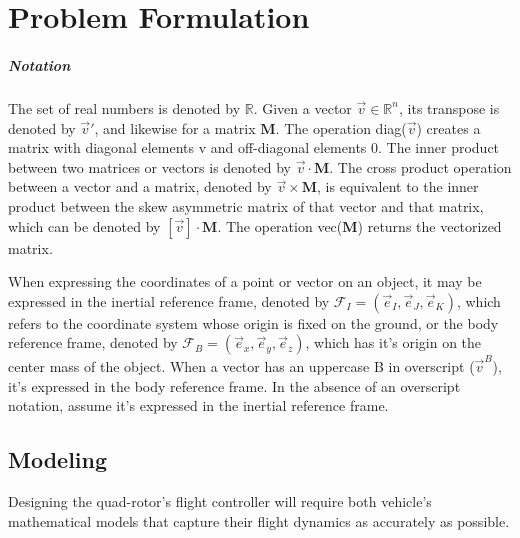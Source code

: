 
%

\chapter{Problem Formulation}
\label{ch:problem_formulation}

\paragraph*{Notation} 
\par The set of real numbers is denoted by $\mathbb{R}$. Given a vector $\vec{v} \in \mathbb{R}^n$, its transpose is denoted by $\vec{v}'$, and likewise for a matrix $\mathbf{M}$. The operation diag($\vec{v}$) creates a matrix with diagonal elements v and off-diagonal elements 0. The inner product between two matrices or vectors is denoted by $\vec{v} \cdot \mathbf{M}$. The cross product operation between a vector and a matrix, denoted by $\vec{v} \times \mathbf{M}$, is equivalent to the inner product between the skew asymmetric matrix of that vector and that matrix, which can be denoted by $[\vec{v}] \cdot \mathbf{M}$. The operation vec($\mathbf{M}$) returns the vectorized matrix.
\par When expressing the coordinates of a point or vector on an object, it may be expressed in the inertial reference frame, denoted by $\mathcal{F}_I = (\vec{e}_I, \vec{e}_J, \vec{e}_K)$, which refers to the coordinate system whose origin is fixed on the ground, or the body reference frame, denoted by $\mathcal{F}_B = (\vec{e}_x, \vec{e}_y, \vec{e}_z)$, which has it's origin on the center mass of the object. When a vector has an uppercase B in overscript ($\vec{v}^B$), it's expressed in the body reference frame. In the absence of an overscript notation, assume it's expressed in the inertial reference frame. \\

\section{Modeling}
Designing the quad-rotor's flight controller will require both vehicle's mathematical models that capture their flight dynamics as accurately as possible. 

